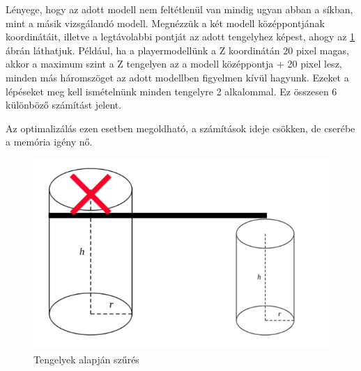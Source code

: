 \newpage
{}
Lényege, hogy az adott modell nem feltétlenül van mindig ugyan abban a síkban, mint a másik vizsgálandó modell. Megnézzük a két modell középpontjának koordinátáit, illetve a legtávolabbi pontját az adott tengelyhez képest, ahogy az \ref{fig:opt_3} ábrán láthatjuk. Például, ha a playermodellünk a Z koordinátán 20 pixel magas, akkor a maximum szint a Z tengelyen az a modell középpontja + 20 pixel lesz, minden más háromszöget az adott modellben figyelmen kívül hagyunk. Ezeket a lépéseket meg kell ismételnünk minden tengelyre 2 alkalommal. Ez összesen 6 különböző számítást jelent.

Az optimalizálás ezen esetben megoldható, a számítások ideje csökken, de cserébe a memória igény nő.
\begin{figure}[h]
	\centering
	\includegraphics[width=13truecm, height=7.5truecm]{images/opt_5.3.png}
	\caption{Tengelyek alapján szűrés}
	\label{fig:opt_3}
\end{figure}